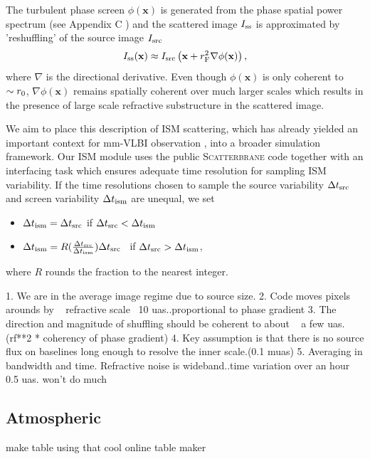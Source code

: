 The turbulent phase screen $\phi(\mathbf{x})$ is generated from the phase spatial power spectrum (see Appendix C \citet*{Johnson_2015a}) and the scattered image $I_{\rm ss}$ is approximated by 'reshuffling' of the source image $I_{\rm src}$
\begin{equation}
I_{\rm ss}(\mathbf{x}) \approx I_{\rm src}\left(\mathbf{x} + r_{\rm F}^2 \nabla \phi(\mathbf{x})\right),
\end{equation}
where $\nabla$ is the directional derivative. Even though $\phi(\mathbf{x})$ is only coherent to $\sim r_{\rm 0}$, $\nabla \phi(\mathbf{x})$ remains spatially coherent over much larger scales which results in the presence of large scale refractive substructure in the scattered image. 


We aim to place this description of ISM scattering, which has already yielded an important context for mm-VLBI observation \citep[e.g.][]{2016arXiv160106571O}, into a broader simulation framework. Our ISM module uses the public \textsc{Scatterbrane} code together with an interfacing task which ensures adequate time resolution for sampling ISM variability. If the time resolutions chosen to sample the source variability $\Delta t_{\rm src}$ and screen variability $\Delta t_{\rm ism}$ are unequal, we set  
\begin{itemize}
 \setlength\itemsep{1em}
\item $\Delta t_{\rm ism}=\Delta t_{\rm src}$ \qquad \qquad if \qquad  $\Delta t_{\rm src} < \Delta t_{\rm ism}$
\item $\Delta t_{\rm ism}=R(\frac{\Delta t_{\rm src}}{\Delta t_{\rm ism}})\Delta t_{\rm src}$ \ if \qquad  $\Delta t_{\rm src} > \Delta t_{\rm ism}$,
\end{itemize}
where $R$ rounds the fraction to the nearest integer. 

1. We are in the average image regime due to source size.
2. Code moves pixels arounds by ~ refractive scale ~10 uas..proportional to phase gradient 
3. The direction and magnitude of shuffling should be coherent to about ~ a few uas. (rf**2 * coherency of phase gradient)
4. Key assumption is that there is no source flux on baselines long enough to resolve the inner scale.(0.1 muas)
5. Averaging in bandwidth and time. Refractive noise is wideband..time variation over an hour ~ 0.5 uas. won't do much

\subsection{Atmospheric}
make table using that cool online table maker\\


